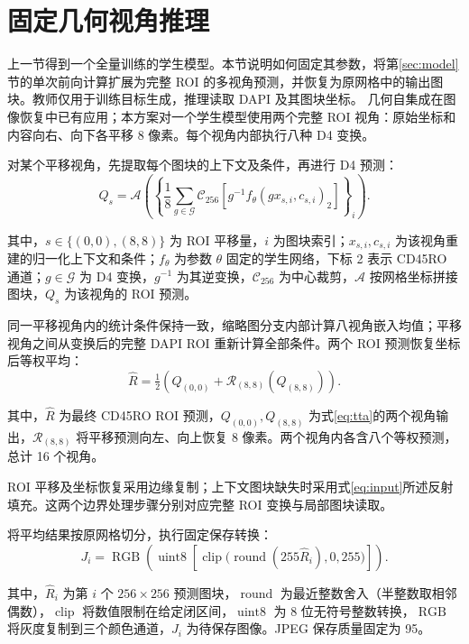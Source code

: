 \documentclass[UTF8,a4paper,zihao=5,fontset=fandol]{ctexart}
\newcommand{\op}[1]{\operatorname{#1}}
\newcommand{\sym}[1]{\par\nobreak\noindent\begin{minipage}{\linewidth}#1\end{minipage}\par}
\begin{document}
\FloatBarrier
\section{固定几何视角推理}\label{sec:inference}
上一节得到一个全量训练的学生模型。本节说明如何固定其参数，将第\ref{sec:model}节的单次前向计算扩展为完整 ROI 的多视角预测，并恢复为原网格中的输出图块。教师仅用于训练目标生成，推理读取 DAPI 及其图块坐标。
几何自集成在图像恢复中已有应用\cite{edsr}；本方案对一个学生模型使用两个完整 ROI 视角：原始坐标和内容向右、向下各平移 8 像素。每个视角内部执行八种 D4 变换。

对某个平移视角，先提取每个图块的上下文及条件，再进行 D4 预测：
\begin{equation}
Q_s=\mathcal A\!\left(
\left\{\frac18\sum_{g\in\mathcal G}\mathcal C_{256}
\left[g^{-1}f_\theta(gx_{s,i},c_{s,i})_2\right]\right\}_i
\right).
\label{eq:tta}
\end{equation}
\sym{其中，$s\in\{(0,0),(8,8)\}$ 为 ROI 平移量，$i$ 为图块索引；$x_{s,i},c_{s,i}$ 为该视角重建的归一化上下文和条件；$f_\theta$ 为参数 $\theta$ 固定的学生网络，下标 2 表示 CD45RO 通道；$g\in\mathcal G$ 为 D4 变换，$g^{-1}$ 为其逆变换，$\mathcal C_{256}$ 为中心裁剪，$\mathcal A$ 按网格坐标拼接图块，$Q_s$ 为该视角的 ROI 预测。}
同一平移视角内的统计条件保持一致，缩略图分支内部计算八视角嵌入均值；平移视角之间从变换后的完整 DAPI ROI 重新计算全部条件。两个 ROI 预测恢复坐标后等权平均：
\begin{equation}
\hat R=\tfrac12\left(Q_{(0,0)}+
\mathcal R_{(8,8)}(Q_{(8,8)})\right).
\label{eq:translate}
\end{equation}
\sym{其中，$\hat R$ 为最终 CD45RO ROI 预测，$Q_{(0,0)},Q_{(8,8)}$ 为式\eqref{eq:tta}的两个视角输出，$\mathcal R_{(8,8)}$ 将平移预测向左、向上恢复 8 像素。两个视角内各含八个等权预测，总计 16 个视角。}
ROI 平移及坐标恢复采用边缘复制；上下文图块缺失时采用式\eqref{eq:input}所述反射填充。这两个边界处理步骤分别对应完整 ROI 变换与局部图块读取。

将平均结果按原网格切分，执行固定保存转换：
\begin{equation}
J_i=\op{RGB}\left(\op{uint8}\left[
\op{clip}\bigl(\op{round}(255\hat R_i),0,255\bigr)\right]\right).
\label{eq:save}
\end{equation}
\sym{其中，$\hat R_i$ 为第 $i$ 个 $256\times256$ 预测图块，$\op{round}$ 为最近整数舍入（半整数取相邻偶数），$\op{clip}$ 将数值限制在给定闭区间，$\op{uint8}$ 为 8 位无符号整数转换，$\op{RGB}$ 将灰度复制到三个颜色通道，$J_i$ 为待保存图像。JPEG 保存质量固定为 95。}

\FloatBarrier
\end{document}
